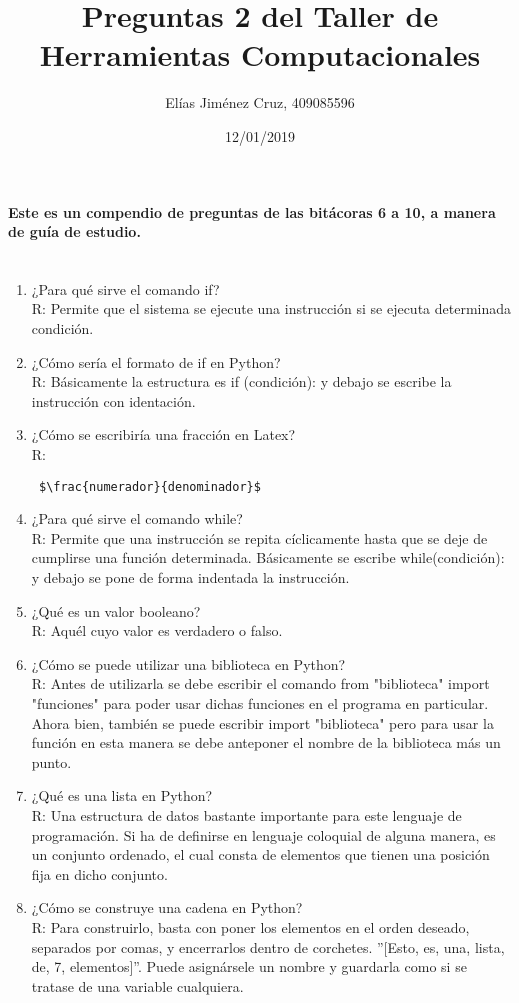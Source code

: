 \documentclass[letterpaper, 12pt, oneside]{article} %
\title{\Huge Preguntas 2 del Taller de Herramientas Computacionales}
\author{Elías Jiménez Cruz, 409085596}
\date{12/01/2019}
\begin{document}
	\maketitle
	\paragraph{Este es un compendio de preguntas de las bitácoras 6 a 10, a manera de guía de estudio.\\\\}
	\begin{enumerate}
		\item ¿Para qué sirve el comando if?\\R: Permite que el sistema se ejecute una instrucción si se ejecuta determinada condición.
		\item ¿Cómo sería el formato de if en Python?\\R: Básicamente la estructura es if (condición): y debajo se escribe la instrucción con identación.
		\item ¿Cómo se escribiría una fracción en Latex?\\R: \begin{verbatim} $\frac{numerador}{denominador}$ \end{verbatim}
		\item ¿Para qué sirve el comando while?\\R: Permite que una instrucción se repita cíclicamente hasta que se deje de cumplirse una función determinada. Básicamente se escribe while(condición): y debajo se pone de forma indentada la instrucción.
		\item ¿Qué es un valor booleano?\\R: Aquél cuyo valor es verdadero o falso.
		\item ¿Cómo se puede utilizar una biblioteca en Python?\\R: Antes de utilizarla se debe escribir el comando from "biblioteca" import "funciones" para poder usar dichas funciones en el programa en particular. Ahora bien, también se puede escribir import "biblioteca" pero para usar la función en esta manera se debe anteponer el nombre de la biblioteca más un punto.
		\item ¿Qué es una lista en Python?\\R: Una estructura de datos bastante importante para este lenguaje de programación. Si ha de definirse en lenguaje coloquial de alguna manera, es un conjunto ordenado, el cual consta de elementos que tienen una posición fija en dicho conjunto.
		\item ¿Cómo se construye una cadena en Python?\\R: Para construirlo, basta con poner los elementos en el orden deseado, separados por comas, y encerrarlos dentro de corchetes. ”[Esto, es, una, lista, de, 7, elementos]”. Puede asignársele un nombre y guardarla como si se tratase de una variable cualquiera.

\end{enumerate}
\end{document}
